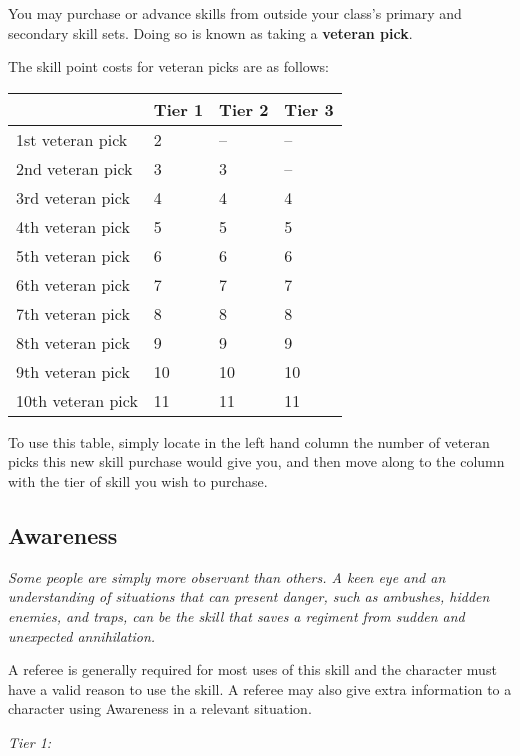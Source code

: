 \documentclass{scrbook}
\begin{document}
You may purchase or advance skills from outside your class's primary and secondary skill sets. Doing so is known as taking a \textbf{veteran pick}.

The skill point costs for veteran picks are as follows:

\begin{table}
\begin{tabular}{|l|l|l|l|} \hline 
 & Tier 1 & Tier 2 & Tier 3 \\
 \hline 1st veteran pick & 2 & -- & -- \\
 \hline 2nd veteran pick & 3 & 3 & -- \\
 \hline 3rd veteran pick & 4 & 4 & 4 \\
 \hline 4th veteran pick & 5 & 5 & 5 \\
 \hline 5th veteran pick & 6 & 6 & 6 \\
 \hline 6th veteran pick & 7 & 7 & 7 \\
 \hline 7th veteran pick & 8 & 8 & 8 \\
 \hline 8th veteran pick & 9 & 9 & 9 \\
 \hline 9th veteran pick & 10 & 10 & 10 \\
 \hline 10th veteran pick & 11 & 11 & 11 \\
 \hline \end{tabular}

\end{table}

To use this table, simply locate in the left hand column the number of veteran picks this new skill purchase would give you, and then move along to the column with the tier of skill you wish to purchase.

\subsection{Awareness}

\textit{Some people are simply more observant than others. A keen eye and an understanding of situations that can present danger, such as ambushes, hidden enemies, and traps, can be the skill that saves a regiment from sudden and unexpected annihilation.}

A referee is generally required for most uses of this skill and the character must have a valid reason to use the skill. A referee may also give extra information to a character using Awareness in a relevant situation.

\textit{Tier 1:}
\end{document}
